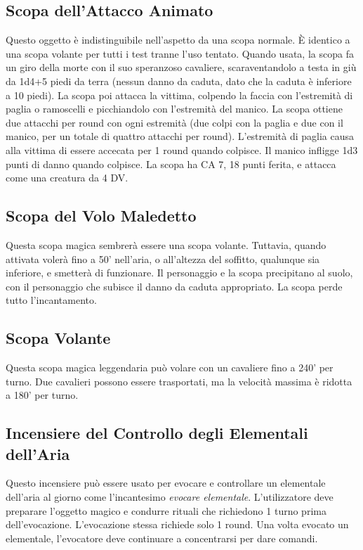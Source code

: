 \documentclass{article}
\begin{document}
\begin{multicols}{2}
\subsection{Scopa dell'Attacco Animato}
Questo oggetto è indistinguibile nell'aspetto da una scopa normale. È identico a una scopa volante per tutti i test tranne l'uso tentato. Quando usata, la scopa fa un giro della morte con il suo speranzoso cavaliere, scaraventandolo a testa in giù da 1d4+5 piedi da terra (nessun danno da caduta, dato che la caduta è inferiore a 10 piedi). La scopa poi attacca la vittima, colpendo la faccia con l'estremità di paglia o ramoscelli e picchiandolo con l'estremità del manico. La scopa ottiene due attacchi per round con ogni estremità (due colpi con la paglia e due con il manico, per un totale di quattro attacchi per round). L'estremità di paglia causa alla vittima di essere accecata per 1 round quando colpisce. Il manico infligge 1d3 punti di danno quando colpisce. La scopa ha CA 7, 18 punti ferita, e attacca come una creatura da 4 DV.

\subsection{Scopa del Volo Maledetto}
Questa scopa magica sembrerà essere una scopa volante. Tuttavia, quando attivata volerà fino a 50' nell'aria, o all'altezza del soffitto, qualunque sia inferiore, e smetterà di funzionare. Il personaggio e la scopa precipitano al suolo, con il personaggio che subisce il danno da caduta appropriato. La scopa perde tutto l'incantamento.

\subsection{Scopa Volante}
Questa scopa magica leggendaria può volare con un cavaliere fino a 240' per turno. Due cavalieri possono essere trasportati, ma la velocità massima è ridotta a 180' per turno.

\subsection{Incensiere del Controllo degli Elementali dell'Aria}
Questo incensiere può essere usato per evocare e controllare un elementale dell'aria al giorno come l'incantesimo \textit{evocare elementale}. L'utilizzatore deve preparare l'oggetto magico e condurre rituali che richiedono 1 turno prima dell'evocazione. L'evocazione stessa richiede solo 1 round. Una volta evocato un elementale, l'evocatore deve continuare a concentrarsi per dare comandi.


\end{multicols}
\end{document}
